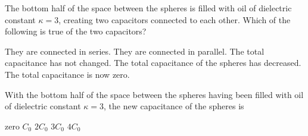 \documentclass{../../oss-apphys-exam}
\begin{document}
\begin{questions}
  \question The bottom half of the space between the spheres is filled with
  oil of dielectric constant $\kappa=3$, creating two capacitors connected to
  each other. Which of the following is true of the two capacitors?
  \begin{center}
  \end{center}
  \begin{choices}
    \choice They are connected in series.
    \choice They are connected in parallel.
    \choice The total capacitance has not changed.
    \choice The total capacitance of the spheres has decreased.
    \choice The total capacitance is now zero.
  \end{choices}
    
  \question With the bottom half of the space between the spheres having been
  filled with oil of dielectric constant $\kappa=3$, the new capacitance of
  the spheres is
  \label{cap2}
  \begin{choices}
    \choice zero
    \choice $C_0$
    \choice $2C_0$
    \choice $3C_0$
    \choice $4C_0$
  \end{choices}   
\end{questions}
\newpage


\genfreedirections
\end{document}
